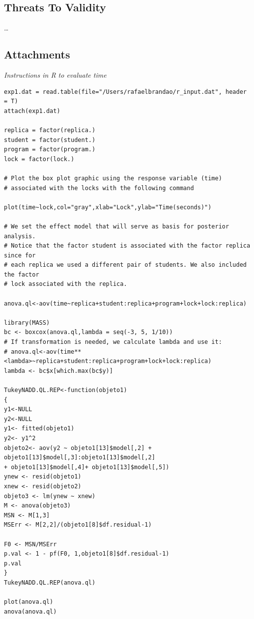 \subsection{Threats To Validity}

\dots





\subsection{Attachments}

\noindent
{\it Instructions in R to evaluate time}
\begin{verbatim}
exp1.dat = read.table(file="/Users/rafaelbrandao/r_input.dat", header = T)
attach(exp1.dat)

replica = factor(replica.)
student = factor(student.)
program = factor(program.)
lock = factor(lock.)

# Plot the box plot graphic using the response variable (time)
# associated with the locks with the following command

plot(time~lock,col="gray",xlab="Lock",ylab="Time(seconds)")

# We set the effect model that will serve as basis for posterior analysis.
# Notice that the factor student is associated with the factor replica since for
# each replica we used a different pair of students. We also included the factor
# lock associated with the replica.

anova.ql<-aov(time~replica+student:replica+program+lock+lock:replica)

library(MASS)
bc <- boxcox(anova.ql,lambda = seq(-3, 5, 1/10))
# If transformation is needed, we calculate lambda and use it:
# anova.ql<-aov(time**<lambda>~replica+student:replica+program+lock+lock:replica)
lambda <- bc$x[which.max(bc$y)]

TukeyNADD.QL.REP<-function(objeto1)
{
y1<-NULL
y2<-NULL
y1<- fitted(objeto1)
y2<- y1^2
objeto2<- aov(y2 ~ objeto1[13]$model[,2] +
objeto1[13]$model[,3]:objeto1[13]$model[,2]
+ objeto1[13]$model[,4]+ objeto1[13]$model[,5])
ynew <- resid(objeto1)
xnew <- resid(objeto2)
objeto3 <- lm(ynew ~ xnew)
M <- anova(objeto3)
MSN <- M[1,3]
MSErr <- M[2,2]/(objeto1[8]$df.residual-1)

F0 <- MSN/MSErr
p.val <- 1 - pf(F0, 1,objeto1[8]$df.residual-1)
p.val
}
TukeyNADD.QL.REP(anova.ql)

plot(anova.ql)
anova(anova.ql)
\end{verbatim}

